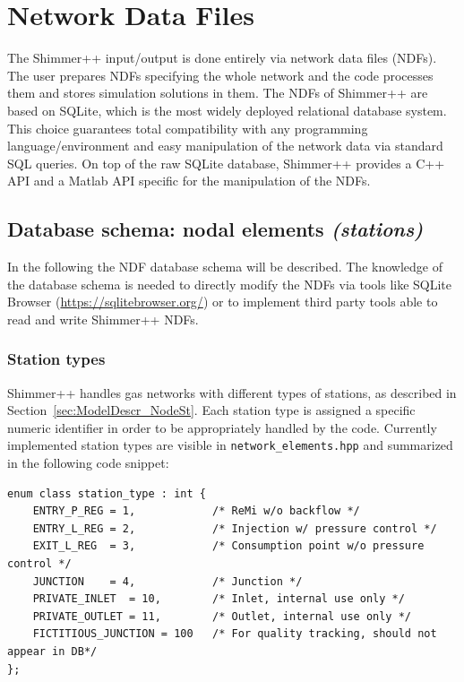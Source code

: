 \clearpage
\section{Network Data Files}
\label{sec:database}

The Shimmer++ input/output is done entirely via network data files (NDFs). The
user prepares NDFs specifying the whole network and the code processes them and
stores simulation solutions in them.
The NDFs of Shimmer++ are based on SQLite, which is the
most widely deployed relational database system. This choice guarantees total
compatibility with any programming language/environment and easy manipulation of
the network data via standard SQL queries. On top of the raw SQLite database, Shimmer++ provides a C++
API and a Matlab API specific for the manipulation of the NDFs.

\subsection{Database schema: nodal elements \textit{(stations)}}
In the following the NDF database schema will be described. The knowledge of
the database schema is needed to directly modify the NDFs via tools like
SQLite Browser (\url{https://sqlitebrowser.org/}) or to implement third party
tools able to read and write Shimmer++ NDFs.

\subsubsection{Station types}
Shimmer++ handles gas networks with different types of stations, as described
in Section~\ref{sec:ModelDescr_NodeSt}. Each station type is assigned a specific
numeric identifier in order to be appropriately handled by the code. Currently
implemented station types are visible in \texttt{network\_elements.hpp} and
summarized in the following code snippet: 

\begin{verbatim}
enum class station_type : int {
    ENTRY_P_REG = 1,            /* ReMi w/o backflow */
    ENTRY_L_REG = 2,            /* Injection w/ pressure control */
    EXIT_L_REG  = 3,            /* Consumption point w/o pressure control */
    JUNCTION    = 4,            /* Junction */
    PRIVATE_INLET  = 10,        /* Inlet, internal use only */
    PRIVATE_OUTLET = 11,        /* Outlet, internal use only */
    FICTITIOUS_JUNCTION = 100   /* For quality tracking, should not appear in DB*/
};
\end{verbatim}

